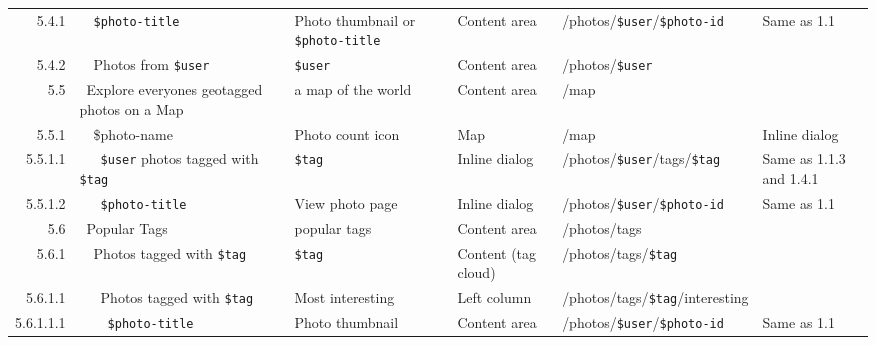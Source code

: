\documentclass[11pt,a4paper]{article}
\newcommand{\var}[1]{\texttt{\${#1}}}
\begin{document}
\begin{landscape}
\begin{table}[h!b!p!]
\begin{center}
\begin{tiny}
\begin{tabular}{r|l|l|l|l|p{3cm}}
                5.4.1 &
                ~~\var{photo-title} &
                Photo thumbnail or \var{photo-title} &
                Content area &
                /photos/\var{user}/\var{photo-id} &
                Same as 1.1 \\

                5.4.2 &
                ~~Photos from \var{user} &
                \var{user} &
                Content area &
                /photos/\var{user} &
                \\

              5.5 &
              ~Explore everyones geotagged photos on a Map &
              a map of the world &
              Content area &
              /map &
              \\

                5.5.1 &
                ~~\$photo-name &
                Photo count icon &
                Map &
                /map &
                Inline dialog\\

                  5.5.1.1 &
                  ~~~\var{user} photos tagged with \var{tag} &
                  \var{tag} &
                  Inline dialog &
                  /photos/\var{user}/tags/\var{tag} &
                  Same as 1.1.3 and 1.4.1\\

                  5.5.1.2 &
                  ~~~\var{photo-title} &
                  View photo page &
                  Inline dialog &
                  /photos/\var{user}/\var{photo-id} &
                  Same as 1.1 \\

              5.6 &
              ~Popular Tags &
              popular tags &
              Content area &
              /photos/tags &
              \\

                5.6.1 &
                ~~Photos tagged with \var{tag} &
                \var{tag} &
                Content (tag cloud) &
                /photos/tags/\var{tag} &
                \\

                  5.6.1.1 &
                  ~~~Photos tagged with \var{tag} &
                  Most interesting &
                  Left column &
                  /photos/tags/\var{tag}/interesting &
                  \\

                    5.6.1.1.1 &
                    ~~~~\var{photo-title} &
                    Photo thumbnail &
                    Content area &
                    /photos/\var{user}/\var{photo-id} &
                    Same as 1.1 \\


\end{tabular}
\end{tiny}
\end{center}
\end{table}
\end{landscape}
\end{document}
